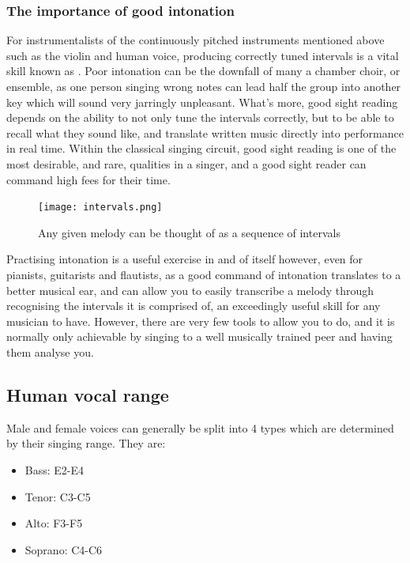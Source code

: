 	\subsubsection{The importance of good intonation}
	\par For instrumentalists of the continuously pitched instruments mentioned above such as the violin and human voice, producing correctly tuned intervals is a vital skill known as . Poor intonation can be the downfall of many a chamber choir, or ensemble, as one person singing wrong notes can lead half the group into another key which will sound very jarringly unpleasant. What's more, good sight reading depends on the ability to not only tune the intervals correctly, but to be able to recall what they sound like, and translate written music directly into performance in real time. Within the classical singing circuit, good sight reading is one of the most desirable, and rare, qualities in a singer, and a good sight reader can command high fees for their time.
	\begin{figure}[h]
		\centering
		\texttt{[image: intervals.png]}
		\caption{Any given melody can be thought of as a sequence of intervals}
	\end{figure}		
	
	\par Practising intonation is a useful exercise in and of itself however, even for pianists, guitarists and flautists, as a good command of intonation translates to a better musical ear, and can allow you to easily transcribe a melody through recognising the intervals it is comprised of, an exceedingly useful skill for any musician to have. However, there are very few tools to allow you to do, and it is normally only achievable by singing to a well musically trained peer and having them analyse you.
	
	\subsection{Human vocal range}
	Male and female voices can generally be split into 4 types which are determined by their singing range. They are:
	\begin{itemize}
		\item Bass: E2-E4
		\item Tenor: C3-C5
		\item Alto: F3-F5
		\item Soprano: C4-C6
	\end{itemize}
	
